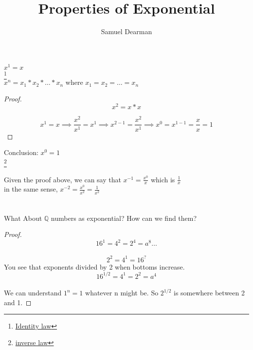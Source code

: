 \documentclass{article}
\title{Properties of Exponential}
\author{Samuel Dearman}
\theoremstyle{mytheoremstyle}
\theoremstyle{mytheoremstyle}
\theoremstyle{myproblemstyle}
\begin{document}
    \maketitle
    $x^1=x$ \\ \footnote{\href{file:///home/uhh/_Documents/existence/Existence/lang/algebra/fundamentals/properties/identity/definition.pdf}{Identity law}} \\
    $x^n= x_1 * x_2 * \dots * x_n$ where $x_1=x_2=\dots=x_n$
    \begin{proof}
      $$
      x^2 = x*x 
      $$ 

      $$
        x^1=x 
        \implies \frac{x^2}{x^1} = x^1
        \implies x^{2-1} = \frac{x^2}{x^1}
        \implies x^0 = x^{1-1} = \frac{x}{x} = 1
      $$
    \end{proof}
 Conclusion: $x^0 = 1$ \\  \footnote{\href{file:///home/uhh/_Documents/existence/Existence/lang/algebra/fundamentals/properties/inverse/definition.pdf}{inverse law}} \\ 
 \\ 
 Given the proof above, we can say that $x^{-1} = \frac{x^0}{x}$ which is $\frac{1}{x}$ \\ 
 in the same sense, $\displaystyle{x^{-2}=\frac{x^0}{x^2} = \frac{1}{x^2}}$  \\ 
 \\ 
 \\ 
  What About $\mathbb{Q}$ numbers as exponential? How can we find them?
\begin{proof}
  $$ 
  16^1 = 4^2 = 2^4 = a^8 \dots
  $$ \\ 
  $$ 
  2^2 = 4^1 = 16^{?}
  $$ 
  You see that exponents divided by 2 when bottoms increase. \\ 
  $$ 
  16^{1/2} = 4^1 = 2^2 = a^4 
  $$ \\ 
  We can understand $1^n = 1$ whatever n might be. 
  So $2^{1/2}$ is somewhere between 2 and 1.  %
\end{proof}
\end{document}
